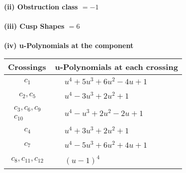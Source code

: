 \documentclass[1p]{elsarticle_modified}
\theoremstyle{definition}
\begin{document}
\flushleft \textbf{(ii) Obstruction class $= -1$}\\~\\
\flushleft \textbf{(iii) Cusp Shapes $= 6$}\\~\\
\newpage\renewcommand{\arraystretch}{1}
\flushleft \textbf{(iv) u-Polynomials at the component}\newline \\
\begin{tabular}{m{50pt}|m{274pt}}
Crossings & \hspace{64pt}u-Polynomials at each crossing \\
\hline $$\begin{aligned}c_{1}\end{aligned}$$&$\begin{aligned}
&u^4+5 u^3+6 u^2-4 u+1
\end{aligned}$\\
\hline $$\begin{aligned}c_{2},c_{5}\end{aligned}$$&$\begin{aligned}
&u^4-3 u^3+2 u^2+1
\end{aligned}$\\
\hline $$\begin{aligned}c_{3},c_{6},c_{9}\\c_{10}\end{aligned}$$&$\begin{aligned}
&u^4- u^3+2 u^2-2 u+1
\end{aligned}$\\
\hline $$\begin{aligned}c_{4}\end{aligned}$$&$\begin{aligned}
&u^4+3 u^3+2 u^2+1
\end{aligned}$\\
\hline $$\begin{aligned}c_{7}\end{aligned}$$&$\begin{aligned}
&u^4-5 u^3+6 u^2+4 u+1
\end{aligned}$\\
\hline $$\begin{aligned}c_{8},c_{11},c_{12}\end{aligned}$$&$\begin{aligned}
&(u-1)^4
\end{aligned}$\\
\hline
\end{tabular}\\~\\
\end{document}
